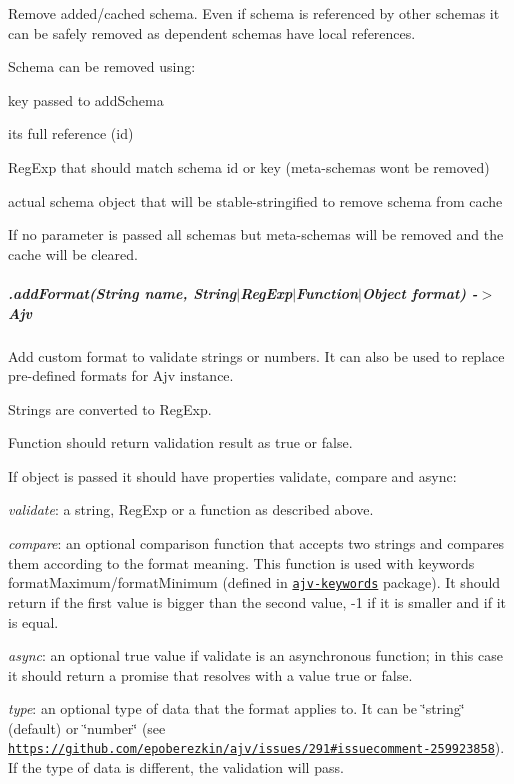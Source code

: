 Remove added/cached schema. Even if schema is referenced by other schemas it can be safely removed as dependent schemas have local references.

Schema can be removed using\+:
\begin{DoxyItemize}
\item key passed to {\ttfamily add\+Schema}
\item it\textquotesingle{}s full reference (id)
\item Reg\+Exp that should match schema id or key (meta-\/schemas won\textquotesingle{}t be removed)
\item actual schema object that will be stable-\/stringified to remove schema from cache
\end{DoxyItemize}

If no parameter is passed all schemas but meta-\/schemas will be removed and the cache will be cleared.

\subparagraph*{\label{_api-addformat}%
.add\+Format(String name, String$\vert$\+Reg\+Exp$\vert$\+Function$\vert$\+Object format) -\/$>$ Ajv}

Add custom format to validate strings or numbers. It can also be used to replace pre-\/defined formats for Ajv instance.

Strings are converted to Reg\+Exp.

Function should return validation result as {\ttfamily true} or {\ttfamily false}.

If object is passed it should have properties {\ttfamily validate}, {\ttfamily compare} and {\ttfamily async}\+:


\begin{DoxyItemize}
\item {\itshape validate}\+: a string, Reg\+Exp or a function as described above.
\item {\itshape compare}\+: an optional comparison function that accepts two strings and compares them according to the format meaning. This function is used with keywords {\ttfamily format\+Maximum}/{\ttfamily format\+Minimum} (defined in \href{https://github.com/epoberezkin/ajv-keywords}{\tt ajv-\/keywords} package). It should return {} if the first value is bigger than the second value, {\ttfamily -\/1} if it is smaller and {} if it is equal.
\item {\itshape async}\+: an optional {\ttfamily true} value if {\ttfamily validate} is an asynchronous function; in this case it should return a promise that resolves with a value {\ttfamily true} or {\ttfamily false}.
\item {\itshape type}\+: an optional type of data that the format applies to. It can be {\ttfamily \char`\"{}string\char`\"{}} (default) or {\ttfamily \char`\"{}number\char`\"{}} (see \href{https://github.com/epoberezkin/ajv/issues/291#issuecomment-259923858}{\tt https\+://github.\+com/epoberezkin/ajv/issues/291\#issuecomment-\/259923858}). If the type of data is different, the validation will pass.
\end{DoxyItemize}

